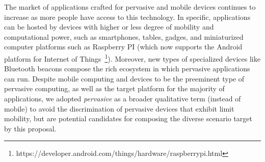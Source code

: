 The market of applications crafted for pervasive and mobile devices continues to increase as more people have access to this technology. In specific, applications can be hosted by devices with higher or less degree of mobility and computational power, such as smartphones, tables, gadges, and miniaturized computer platforms such as Raspberry PI (which now supports the Android platform for Internet of Things~\footnote{https://developer.android.com/things/hardware/raspberrypi.html}). Moreover, new types of specialized devices like Bluetooth beacons compose the rich ecosystem in which pervasive applications can run. Despite mobile computing and devices to be the preeminent type of pervasive computing, as well as the target platform for the majority of applications, we adopted \textit{pervasive} as a broader qualitative term (instead of mobile) to avoid the discrimination of pervasive devices that exhibit limit mobility, but are potential candidates for composing the diverse scenario target by this proposal. 

